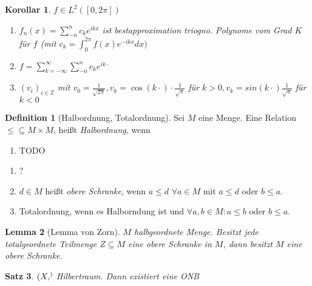 \documentclass[ngerman]{report}
\theoremstyle{plain}%
\newtheorem{thm}{Satz}[chapter]
\newtheorem{lemma}[thm]{Lemma}
\newtheorem*{cor*}{Korollar}
\theoremstyle{definition}%
\newtheorem{definition}[thm]{Definition}
\theoremstyle{myStyle}
\newcommand{\Z}{\mathbb{Z}}
\newcommand{\ff}[3]{(#1_#2)_{#2\in#3}}
\begin{document}
	\begin{cor*}
$f\in L^2([0,2\pi])$
		\begin{enumerate}
			\item $f_n(x) = \sum_{-n}^n c_k e^{ikx}$ ist bestapproximation triogno. Polynome vom Grad $K$ für $f$ (mit $c_k = \int_{0}^{2\pi} f(x) e^{-ikx} dx)$ 
			\item $f = \sum_{k= -\infty}^{\infty} \sum_{-n}^n c_k e^{ik\cdot} $
			\item $\ff{v}{i}{\Z}$ mit $v_0 = \frac{1}{\sqrt{2\pi}}, v_k = \cos(k\cdot)\cdot \frac{1}{\sqrt{\pi}} $ für $ k>0, v_k = sin(k\cdot) \frac{1}{\sqrt{\pi}} $ für $k< 0$
		\end{enumerate}
	\end{cor*}

	\begin{definition}[Halbordnung, Totalordnung]
		Sei $M$ eine Menge. Eine Relation $\leq \subseteq M\times M$, heißt \textit{Halbordnung}, wenn 
			\begin{enumerate}
				\item TODO 
			\end{enumerate}
		\begin{enumerate}
			\item ?
			\item $d \in M$ heißt \textit{obere Schranke}, wenn $a \leq d$ $\forall a\in M$ mit $a \leq d$ oder $b \leq a$.
			\item Totalordnung, wenn es Halborndung ist und $\forall a,b \in M: a \leq b$ oder $b \leq a$.
		\end{enumerate}
	\end{definition}

	\begin{lemma}[Lemma von Zorn]
		$M$ halbgeordnete Menge. Besitzt jede totalgeordnete Teilmenge $Z \subseteq M$ eine obere Schranke in $M$, dann besitzt $M$ eine obere Schranke.	
	\end{lemma}

	\begin{thm}
		$(X, \sp)$ Hilbertraum. Dann existiert eine ONB
	\end{thm}
\end{document}
